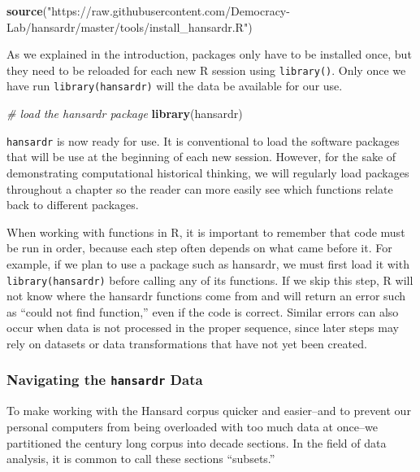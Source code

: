 \documentclass[
]{article}
\newenvironment{Shaded}{\begin{snugshade}}{\end{snugshade}}
\newcommand{\CommentTok}[1]{\textcolor[rgb]{0.56,0.35,0.01}{\textit{#1}}}
\newcommand{\FunctionTok}[1]{\textcolor[rgb]{0.13,0.29,0.53}{\textbf{#1}}}
\newcommand{\NormalTok}[1]{#1}
\newcommand{\StringTok}[1]{\textcolor[rgb]{0.31,0.60,0.02}{#1}}
\begin{document}
\begin{Shaded}
\begin{Highlighting}[]
\FunctionTok{source}\NormalTok{(}\StringTok{"https://raw.githubusercontent.com/Democracy{-}Lab/hansardr/master/tools/install\_hansardr.R"}\NormalTok{)}
\end{Highlighting}
\end{Shaded}

As we explained in the introduction, packages only have to be installed
once, but they need to be reloaded for each new R session using
\texttt{library()}. Only once we have run \texttt{library(hansardr)}
will the data be available for our use.

\begin{Shaded}
\begin{Highlighting}[]
\CommentTok{\# load the hansardr package}
\FunctionTok{library}\NormalTok{(hansardr)}
\end{Highlighting}
\end{Shaded}

\texttt{hansardr} is now ready for use. It is conventional to load the
software packages that will be use at the beginning of each new session.
However, for the sake of demonstrating computational historical
thinking, we will regularly load packages throughout a chapter so the
reader can more easily see which functions relate back to different
packages.

When working with functions in R, it is important to remember that code
must be run in order, because each step often depends on what came
before it. For example, if we plan to use a package such as hansardr, we
must first load it with \texttt{library(hansardr)} before calling any of
its functions. If we skip this step, R will not know where the hansardr
functions come from and will return an error such as ``could not find
function,'' even if the code is correct. Similar errors can also occur
when data is not processed in the proper sequence, since later steps may
rely on datasets or data transformations that have not yet been created.

\subsubsection{\texorpdfstring{Navigating the \texttt{hansardr}
Data}{Navigating the hansardr Data}}\label{navigating-the-hansardr-data}

To make working with the Hansard corpus quicker and easier--and to
prevent our personal computers from being overloaded with too much data
at once--we partitioned the century long corpus into decade sections. In
the field of data analysis, it is common to call these sections
``subsets.''
\end{document}
